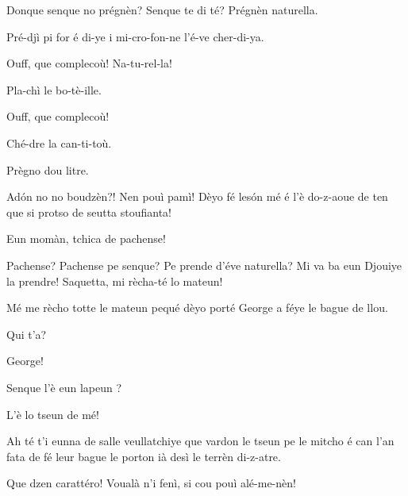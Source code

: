 \begin{drama}
\Claudinespeaks{} Donque senque no prégnèn? Senque te di té? Prégnèn naturella.


\Machinaspeaks {} Pré-djì pi for é di-ye i mi-cro-fon-ne l’é-ve cher-di-ya.

\Claudinespeaks Ouff, que complecoù!  Na-tu-rel-la!


\Machinaspeaks Pla-chì le bo-tè-ille.

\Claudinespeaks Ouff, que complecoù!


\Machinaspeaks Ché-dre la can-ti-toù.

\Claudinespeaks Prègno dou litre. 

\Giacospeaks{} Ad\'on no no boudzèn?! Nen pouì pamì! Dèyo fé les\'on mé é l'è do-z-aoue de ten que si protso  de seutta stoufianta!

\Claudinespeaks {} Eun momàn, tchica de pachense!

\Giacospeaks Pachense? Pachense pe senque? Pe prende d'éve naturella? Mi va ba eun Djouiye la prendre! Saquetta, mi rècha-té lo mateun! 

\Claudinespeaks{} Mé me rècho totte le mateun pequé dèyo porté George a féye le bague de llou\cacca .

\Giacospeaks Qui t'a?

\Claudinespeaks{} George!

\Giacospeaks Senque l'è eun lapeun \coniglio ?

\Claudinespeaks L'è lo tseun de mé!

\Giacospeaks Ah té t'i eunna de salle veullatchiye que vardon le tseun pe le mitcho é can l’an fata de fé leur bague le porton ià desì le terrèn di-z-atre.

\Claudinespeaks Que dzen carattéro! Voualà n’i fenì, si cou pouì alé-me-nèn!



\end{drama}
